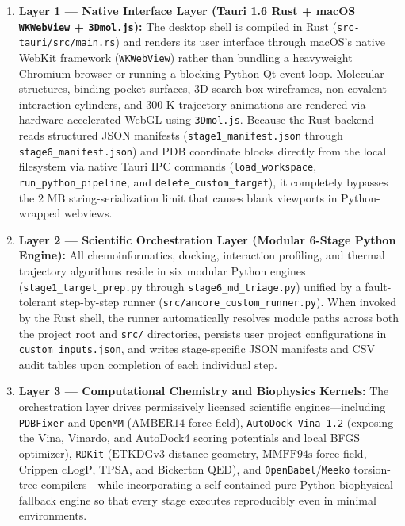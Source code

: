 \documentclass[11pt,a4paper]{article}
\begin{document}
\begin{enumerate}
  \setlength{\itemsep}{3pt}
  \setlength{\parskip}{0pt}
  \item \textbf{Layer 1 --- Native Interface Layer (Tauri 1.6 Rust + macOS \texttt{WKWebView} + \texttt{3Dmol.js}):} The desktop shell is compiled in Rust (\texttt{src-tauri/src/main.rs}) and renders its user interface through macOS's native WebKit framework (\texttt{WKWebView}) rather than bundling a heavyweight Chromium browser or running a blocking Python Qt event loop. Molecular structures, binding-pocket surfaces, 3D search-box wireframes, non-covalent interaction cylinders, and $300\text{ K}$ trajectory animations are rendered via hardware-accelerated WebGL using \texttt{3Dmol.js}. Because the Rust backend reads structured JSON manifests (\texttt{stage1\_manifest.json} through \texttt{stage6\_manifest.json}) and PDB coordinate blocks directly from the local filesystem via native Tauri IPC commands (\texttt{load\_workspace}, \texttt{run\_python\_pipeline}, and \texttt{delete\_custom\_target}), it completely bypasses the $2\text{ MB}$ string-serialization limit that causes blank viewports in Python-wrapped webviews.
  \item \textbf{Layer 2 --- Scientific Orchestration Layer (Modular 6-Stage Python Engine):} All chemoinformatics, docking, interaction profiling, and thermal trajectory algorithms reside in six modular Python engines (\texttt{stage1\_target\_prep.py} through \texttt{stage6\_md\_triage.py}) unified by a fault-tolerant step-by-step runner (\texttt{src/ancore\_custom\_runner.py}). When invoked by the Rust shell, the runner automatically resolves module paths across both the project root and \texttt{src/} directories, persists user project configurations in \texttt{custom\_inputs.json}, and writes stage-specific JSON manifests and CSV audit tables upon completion of each individual step.
  \item \textbf{Layer 3 --- Computational Chemistry and Biophysics Kernels:} The orchestration layer drives permissively licensed scientific engines---including \texttt{PDBFixer} and \texttt{OpenMM} ($\text{AMBER14}$ force field), \texttt{AutoDock Vina 1.2} (exposing the Vina, Vinardo, and AutoDock4 scoring potentials and local BFGS optimizer), \texttt{RDKit} ($\text{ETKDGv3}$ distance geometry, $\text{MMFF94s}$ force field, Crippen $\text{cLogP}$, $\text{TPSA}$, and Bickerton $\text{QED}$), and \texttt{OpenBabel}/\texttt{Meeko} torsion-tree compilers---while incorporating a self-contained pure-Python biophysical fallback engine so that every stage executes reproducibly even in minimal environments.
\end{enumerate}
\end{document}
